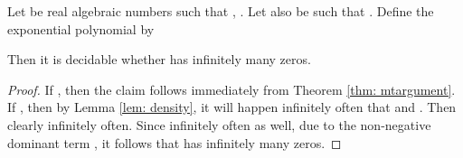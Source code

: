 \begin{lemma}\label{lem: oneOscOneRep}
Let  be real algebraic numbers such that 
,  .
Let also  be
such that
.  
Define the exponential polynomial  by

Then it is decidable whether  has infinitely many
zeros. 
\end{lemma}
\begin{proof}
If , then the claim follows immediately from Theorem
\ref{thm: mtargument}. If , then by Lemma \ref{lem: density},
it will happen infinitely often that  and
. Then clearly  infinitely often.
Since  infinitely often as well, due to the non-negative dominant
term , it follows that  has infinitely many zeros.
\end{proof}














